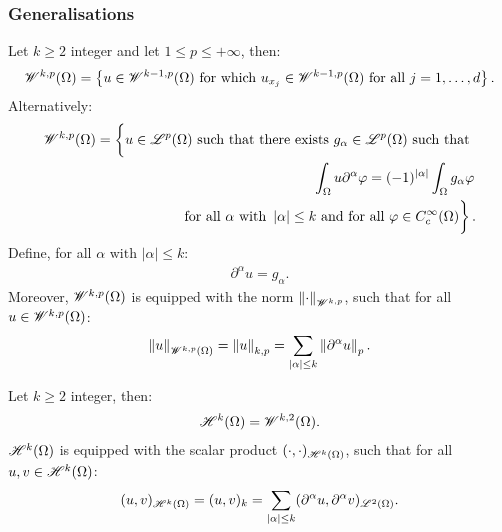 \subsubsection{Generalisations}

\begin{definition}
    Let $k \geq 2$ integer and let $1 \leq p \leq +\infty$, then:
    \begin{align}
        \mathscr{W}^{k, p}(\Omega) = \left\{ u \in \mathscr{W}^{k - 1, p}(\Omega) \text{ for which } u_{x_j} \in \mathscr{W}^{k - 1, p}(\Omega) \text{ for all } j = 1, \dots, d \right\}.
    \end{align}
    Alternatively:
    \begin{align} %
        \SpaceWkp{k}{p}(\Omega) = \left\{ \vphantom{\int_{\Omega}} u \in \SpaceLp{p}(\Omega) \text{ such that there exists } g_{\alpha} \in \SpaceLp{p}(\Omega) \text{ such that } \right. \notag \\ 
        \left. \int_{\Omega} u \partial^{\alpha} \varphi = (-1)^{\left\lvert \alpha \right\rvert} \int_{\Omega} g_{\alpha} \varphi \right. \notag \\
        \left. \text{ for all } \alpha \text{ with } \left\lvert \alpha \right\rvert \leq k \text{ and for all }\varphi \in C_c^{\infty}(\Omega) \vphantom{\int_{\Omega}} \right\}.
    \end{align}
    Define, for all $\alpha \text{ with } \left\lvert \alpha \right\rvert \leq k$:
    \begin{align}
        \partial^{\alpha} u = g_{\alpha}.
    \end{align}
    Moreover, $\mathscr{W}^{k, p}(\Omega)$ is equipped with the norm $\left\lVert \cdot \right\rVert_{\mathscr{W}^{k, p}}$, such that for all $u \in \mathscr{W}^{k, p}(\Omega)$:
    \begin{align}
        \left\lVert u \right\rVert_{\mathscr{W}^{k, p}(\Omega)} = \left\lVert u \right\rVert_{k, p} = \sum_{\left\lvert \alpha \right\rvert \leq k} \left\lVert \partial^{\alpha} u \right\rVert_p.
    \end{align}
\end{definition}

\begin{definition}
    Let $k \geq 2$ integer, then:
    \begin{align}
        \mathscr{H}^{k}(\Omega) = \mathscr{W}^{k, 2}(\Omega).
    \end{align}
    $\mathscr{H}^{k}(\Omega)$ is equipped with the scalar product $(\cdot, \cdot)_{\mathscr{H}^{k}(\Omega)}$, such that for all $u, v \in \mathscr{H}^{k}(\Omega)$:
    \begin{align}
        (u, v)_{\mathscr{H}^{k}(\Omega)} = (u, v)_k = \sum_{\left\lvert \alpha \right\rvert \leq k} (\partial^{\alpha} u, \partial^{\alpha} v)_{\mathscr{L}^{2}(\Omega)}.
    \end{align}
\end{definition}

